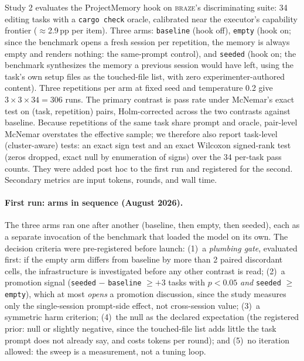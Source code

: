 \documentclass[smallcondensed,natbib]{svjour3}
\newcommand{\braze}{\textsc{braze}}
\begin{document}
Study 2 evaluates the ProjectMemory hook on \braze{}'s discriminating
suite: 34 editing tasks with a \texttt{cargo check} oracle, calibrated
near the executor's capability frontier ($\approx$2.9\,pp per item).
Three arms: \texttt{baseline} (hook off), \texttt{empty} (hook on;
since the benchmark opens a fresh session per repetition, the memory
is always empty and renders nothing: the same-prompt control), and
\texttt{seeded} (hook on; the benchmark synthesizes the memory a
previous session would have left, using the task's own setup files as
the touched-file list, with zero experimenter-authored content). Three
repetitions per arm at fixed seed and temperature 0.2 give $3 \times 3
\times 34 = 306$ runs. The primary contrast is pass rate under
McNemar's exact test on (task, repetition) pairs, Holm-corrected
across the two contrasts against baseline. Because repetitions of the
same task share prompt and oracle, pair-level McNemar overstates the
effective sample; we therefore also report task-level (cluster-aware)
tests: an exact sign test and an exact Wilcoxon signed-rank test
(zeros dropped, exact null by enumeration of signs) over the 34
per-task pass counts. They were added post hoc to the first run and
registered for the second. Secondary metrics are input tokens, rounds,
and wall time.

\paragraph{First run: arms in sequence (August 2026).} The three arms
ran one after another (baseline, then empty, then seeded), each as a
separate invocation of the benchmark that loaded the model on its own.
The decision criteria were pre-registered before launch:
(1)~a \emph{plumbing gate}, evaluated first: if the empty arm
differs from baseline by more than 2 paired discordant cells, the
infrastructure is investigated before any other contrast is read;
(2)~a promotion signal (\texttt{seeded} $-$ \texttt{baseline} $\geq
+3$ tasks with $p<0.05$ \emph{and} \texttt{seeded} $\geq$
\texttt{empty}), which at most \emph{opens} a promotion discussion,
since the study measures only the single-session prompt-side effect,
not cross-session value; (3)~a symmetric harm criterion; (4)~the null
as the declared expectation (the registered prior: null or slightly
negative, since the touched-file list adds little the task prompt does
not already say, and costs tokens per round); and (5)~no iteration
allowed: the sweep is a measurement, not a tuning loop.
\end{document}

